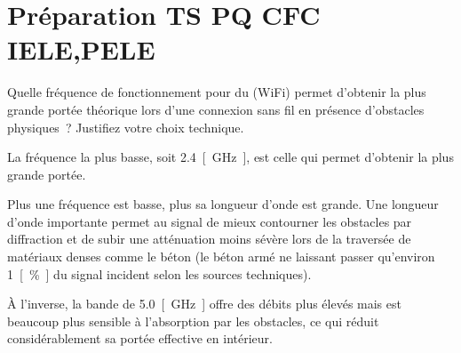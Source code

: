 \documentclass[a4paper,12pt,answers,addpoints]{exam}
\begin{document}
	\unframedsolutions
	\pointsinmargin
	\bracketedpoints
	
\section*{Préparation TS PQ CFC IELE,PELE}
\begin{questions}
\question[3]
Quelle fréquence de fonctionnement pour du (WiFi) permet d'obtenir la plus grande portée théorique lors d'une connexion sans fil en présence d'obstacles physiques~? Justifiez votre choix technique.


\begin{solution}
La fréquence la plus basse, soit \qty{2,4}{[\giga\hertz]}, est celle qui permet d'obtenir la plus grande portée.


Plus une fréquence est basse, plus sa longueur d'onde est grande. Une longueur d'onde importante permet au signal de mieux contourner les obstacles par diffraction et de subir une atténuation moins sévère lors de la traversée de matériaux denses comme le béton (le béton armé ne laissant passer qu'environ \qty{1}{[\percent]} du signal incident selon les sources techniques). 

À l'inverse, la bande de \qty{5,0}{[\giga\hertz]} offre des débits plus élevés mais est beaucoup plus sensible à l'absorption par les obstacles, ce qui réduit considérablement sa portée effective en intérieur.


\end{solution}
\end{questions}
\end{document}
